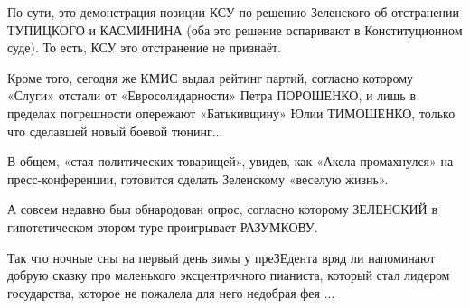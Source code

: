 По сути, это демонстрация позиции КСУ по решению Зеленского об отстранении
ТУПИЦКОГО и КАСМИНИНА (оба это решение оспаривают в Конституционном суде). То
есть, КСУ это отстранение не признаёт.

Кроме того, сегодня же КМИС выдал рейтинг партий, согласно которому «Слуги»
отстали от «Евросолидарности» Петра ПОРОШЕНКО, и лишь в пределах погрешности
опережают «Батькивщину» Юлии ТИМОШЕНКО, только что сделавшей новый боевой
тюнинг...

В общем, «стая политических товарищей», увидев, как «Акела промахнулся» на
пресс-конференции, готовится сделать Зеленскому «веселую жизнь». 

А совсем недавно был обнародован опрос, согласно которому ЗЕЛЕНСКИЙ в
гипотетическом втором туре проигрывает РАЗУМКОВУ.

Так что ночные сны на первый день зимы у преЗЕдента вряд ли напоминают добрую
сказку про маленького эксцентричного пианиста, который стал лидером
государства, которое не пожалела для него недобрая фея ...

